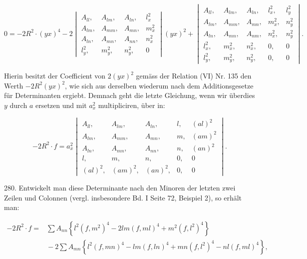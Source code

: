 \documentclass[11pt]{article}
\providecommand{\weq}[2]{\begin{equation}\tag{#1}#2\end{equation}}
\begin{document}
\[
0 = -2R^2\cdot(yx)^4 - 2
\begin{vmatrix}
A_{ll}, & A_{lm}, & A_{ln}, & l_x^2 \\
A_{lm}, & A_{mm}, & A_{mn}, & m_x^2 \\
A_{ln}, & A_{mn}, & A_{nn}, & n_x^2 \\
l_y^2, & m_y^2, & n_y^2, & 0
\end{vmatrix}(yx)^2 +
\begin{vmatrix}
A_{ll}, & A_{lm}, & A_{ln}, & l_x^2, & l_y^2 \\
A_{lm}, & A_{mm}, & A_{mn}, & m_x^2, & n_y^2 \\
A_{ln}, & A_{mn}, & A_{nm}, & n_x^2, & n_y^2 \\
l_x^2, & m_x^2, & n_x^2, & 0, & 0 \\
l_y^2, & m_y^2, & n_y^2, & 0, & 0
\end{vmatrix}.
\]

Hierin besitzt der Coefficient von $2(yx)^2$ gemäss der Relation (VI) Nr. 135 den Werth $-2R^2(yx)^2$, wie sich aus derselben wiederum nach dem Additionsgesetze für Determinanten ergiebt. Demnach geht die letzte Gleichung, wenn wir überdies $y$ durch $a$ ersetzen und mit $a_x^2$ multipliciren, über in:

\[
-2R^2\cdot f = a_x^2
\begin{vmatrix}
A_{ll}, & A_{lm}, & A_{ln}, & l, & (al)^2 \\
A_{lm}, & A_{mm}, & A_{mn}, & m, & (am)^2 \\
A_{ln}, & A_{mn}, & A_{nn}, & n, & (an)^2 \\
l, & m, & n, & 0, & 0 \\
(al)^2, & (am)^2, & (an)^2, & 0, & 0
\end{vmatrix}.
\]

280. Entwickelt man diese Determinante nach den Minoren der letzten zwei Zeilen und Colonnen (vergl. insbesondere Bd. I Seite 72, Beispiel 2), so erhält man:

\weq{I}{\begin{aligned}
-2R^2\cdot f ={}& \sum A_{nn}\left\{ l^2(f,m^2)^4 - 2lm(f,ml)^4 + m^2(f,l^2)^4 \right\} \\
&{}- 2\sum A_{mn}\left\{ l^2(f,mn)^4 - lm(f,ln)^4 + mn(f,l^2)^4 - nl(f,ml)^4 \right\},
\end{aligned}}
\end{document}
